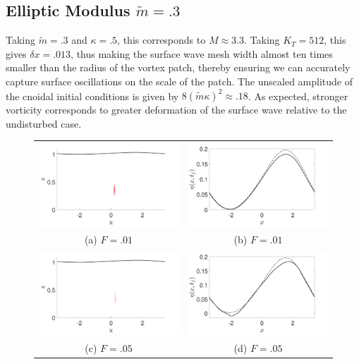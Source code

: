 \documentclass[a4paper,11pt]{article}
\begin{document}
\subsection*{Elliptic Modulus $\tilde{m}=.3$}
Taking $\tilde{m}=.3$ and $\kappa = .5$, this corresponds to $M \approx 3.3$.  Taking $K_{T}=512$, this gives $\delta x = .013$, thus making the surface wave mesh width almost ten times smaller than the radius of the vortex patch, thereby ensuring we can accurately capture surface oscillations on the scale of the patch.  The unscaled amplitude of the cnoidal initial conditions is given by $8(\tilde{m}\kappa)^{2}\approx .18$.  As expected, stronger vorticity corresponds to greater deformation of the surface wave relative to the undisturbed case.  
\begin{figure}
\centering
\begin{tabular}{cc}
\includegraphics[width=.35\textwidth]{wave_over_vortices_m_pt3_w0_1} & \includegraphics[width=.35\textwidth]{profiles_m_pt3_w0_1}\\
(a)  $F=.01$ & (b)  $F=.01$\\
\includegraphics[width=.35\textwidth]{wave_over_vortices_m_pt3_w0_5} & \includegraphics[width=.35\textwidth]{profiles_m_pt3_w0_5}\\
(c)  $F=.05$ & (d)  $F=.05$\\

\end{tabular}
\end{figure}
\end{document}
